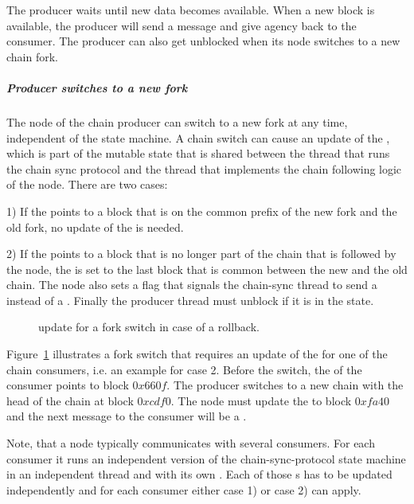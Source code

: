 The producer waits until new data becomes available.
When a new block is available, the producer will
send a \RollForward{} message and give agency back to the consumer.
The producer can also get unblocked when its node switches to a new chain fork.

\subparagraph{Producer switches to a new fork}
The node of the chain producer can switch to a new fork at any time, independent of the
state machine.
A chain switch can cause an update of the \readpointer{},
which is part of the mutable state that is shared between the thread that runs
the chain sync protocol and the thread that implements the chain following logic of the node.
There are two cases:

1) If the \readpointer{} points to a block that is on the common prefix of the new
fork and the old fork, no update of the \readpointer{} is needed.

2) If the \readpointer{} points to a block that is no longer part of the chain that is followed by the node,
the \readpointer{} is set to the last block that is common between the new and the old chain.
The node also sets a flag that signals the chain-sync thread to send a \RollBackward{} instead
of a \RollForward.
Finally the producer thread must unblock if it is in the \MustReply{} state.

\begin{figure}[ht]
\begin{center}
\end{center}
\caption{\readpointer{} update for a fork switch in case of a rollback.}
\label{read-pointer-rollback}
\end{figure}

Figure~\ref{read-pointer-rollback} illustrates a fork switch that requires an update of the \readpointer{}
for one of the chain consumers, i.e. an example for case 2.
Before the switch, the \readpointer{} of the consumer points to block $0x660f$.
The producer switches to a new chain with the head of the chain at block $0xcdf0$.
The node must update the \readpointer{} to block $0xfa40$ and the next message to the consumer
will be a \RollBackward.

Note, that a node typically communicates with several consumers. For each consumer it runs an independent
version of the chain-sync-protocol state machine in an independent thread and with its own \readpointer{}.
Each of those \readpointer{}s has to be updated independently and for each consumer
either case 1) or case 2) can apply.

